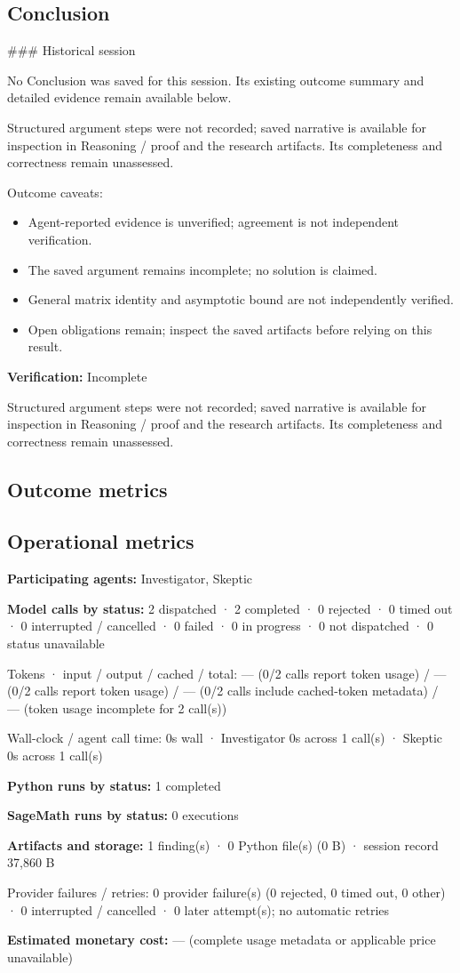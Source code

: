 \documentclass[11pt]{article}
\begin{document}
\subsection{Conclusion}
\#\#\# Historical session

No Conclusion was saved for this session. Its existing outcome summary and detailed evidence remain available below.

Structured argument steps were not recorded; saved narrative is available for inspection in Reasoning / proof and the research artifacts. Its completeness and correctness remain unassessed.\par
Outcome caveats:\par
\begin{itemize}
\item Agent-reported evidence is unverified; agreement is not independent verification.
\item The saved argument remains incomplete; no solution is claimed.
\item General matrix identity and asymptotic bound are not independently verified.
\item Open obligations remain; inspect the saved artifacts before relying on this result.
\end{itemize}
\textbf{Verification:} Incomplete\par
Structured argument steps were not recorded; saved narrative is available for inspection in Reasoning / proof and the research artifacts. Its completeness and correctness remain unassessed.\par
\subsection{Outcome metrics}
\subsection{Operational metrics}
\textbf{Participating agents:} Investigator, Skeptic\par
\textbf{Model calls by status:} 2 dispatched · 2 completed · 0 rejected · 0 timed out · 0 interrupted / cancelled · 0 failed · 0 in progress · 0 not dispatched · 0 status unavailable\par
Tokens · input / output / cached / total: — (0/2 calls report token usage) / — (0/2 calls report token usage) / — (0/2 calls include cached-token metadata) / — (token usage incomplete for 2 call(s))\par
Wall-clock / agent call time: 0s wall · Investigator 0s across 1 call(s) · Skeptic 0s across 1 call(s)\par
\textbf{Python runs by status:} 1 completed\par
\textbf{SageMath runs by status:} 0 executions\par
\textbf{Artifacts and storage:} 1 finding(s) · 0 Python file(s) (0 B) · session record 37,860 B\par
Provider failures / retries: 0 provider failure(s) (0 rejected, 0 timed out, 0 other) · 0 interrupted / cancelled · 0 later attempt(s); no automatic retries\par
\textbf{Estimated monetary cost:} — (complete usage metadata or applicable price unavailable)\par
\end{document}
